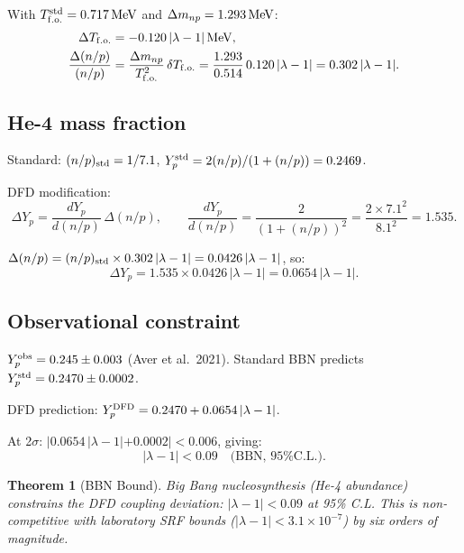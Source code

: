 \documentclass[11pt]{article}
\newtheorem{theorem}{Theorem}
\newcommand{\ee}[1]{\times 10^{#1}}
\newcommand{\lambdaone}{|\lambda-1|}
\begin{document}
With $T_{\rm f.o.}^{\rm std} = 0.717\,{\rm MeV}$ and $\Delta m_{np} = 1.293\,{\rm MeV}$:
\begin{align}
  \Delta T_{\rm f.o.} &= -0.120\,\lambdaone\,{\rm MeV}, \\
  \frac{\Delta(n/p)}{(n/p)} &= \frac{\Delta m_{np}}{T_{\rm f.o.}^2}\,\delta T_{\rm f.o.}
  = \frac{1.293}{0.514}\,0.120\,\lambdaone = 0.302\,\lambdaone.
\end{align}

\subsection{He-4 mass fraction}

Standard: $(n/p)_{\rm std} = 1/7.1$, $Y_p^{\rm std} = 2(n/p)/(1 + (n/p)) = 0.2469$.

DFD modification:
\begin{equation}
  \Delta Y_p = \frac{dY_p}{d(n/p)}\,\Delta(n/p),
  \qquad \frac{dY_p}{d(n/p)} = \frac{2}{(1 + (n/p))^2}
  = \frac{2\times 7.1^2}{8.1^2} = 1.535.
\end{equation}

$\Delta(n/p) = (n/p)_{\rm std}\times 0.302\,\lambdaone = 0.0426\,\lambdaone$,
so:
\begin{equation}
  \Delta Y_p = 1.535 \times 0.0426\,\lambdaone = 0.0654\,\lambdaone.
\end{equation}

\subsection{Observational constraint}

$Y_p^{\rm obs} = 0.245 \pm 0.003$ (Aver et al.\ 2021).
Standard BBN predicts $Y_p^{\rm std} = 0.2470 \pm 0.0002$.

DFD prediction: $Y_p^{\rm DFD} = 0.2470 + 0.0654\,\lambdaone$.

At 2$\sigma$: $|0.0654\,\lambdaone + 0.0002| < 0.006$, giving:
\begin{equation}
  \boxed{\lambdaone < 0.09 \quad\text{(BBN, 95\% C.L.).}}
\end{equation}

\begin{theorem}[BBN Bound]
\label{thm:bbn}
Big Bang nucleosynthesis (He-4 abundance) constrains the DFD coupling
deviation: $\lambdaone < 0.09$ at 95\% C.L.  This is non-competitive
with laboratory SRF bounds ($\lambdaone < 3.1\ee{-7}$) by six orders
of magnitude.
\end{theorem}
\end{document}

